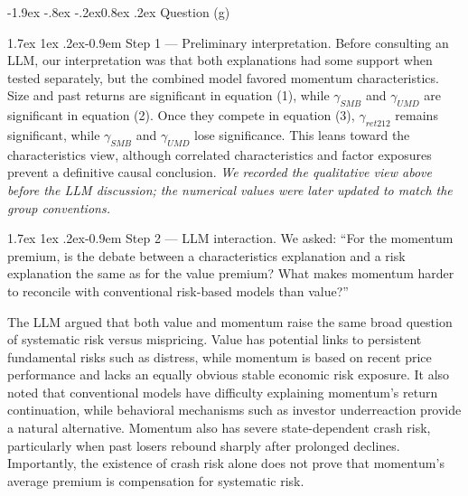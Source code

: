 \documentclass[11pt]{article}
\makeatletter
\renewcommand\subsubsection{\@startsection{subsubsection}{3}{0pt}%
  {-1.9ex \@plus -.8ex \@minus -.2ex}{0.8ex \@plus .2ex}%
  {\normalfont\bfseries\itshape\normalsize\color{psink}}}
\renewcommand\paragraph{\@startsection{paragraph}{4}{0pt}%
  {1.7ex \@plus 1ex \@minus .2ex}{-0.9em}%
  {\normalfont\bfseries\normalsize\color{psink}}}
\makeatother
\begin{document}
\subsubsection{Question (g)}

\paragraph{Step 1 --- Preliminary interpretation.} Before consulting an LLM, our
interpretation was that both explanations had some support when tested separately, but
the combined model favored momentum characteristics. Size and past returns are
significant in equation (1), while $\gamma_{SMB}$ and $\gamma_{UMD}$ are significant in
equation (2). Once they compete in equation (3), $\gamma_{ret212}$ remains significant,
while $\gamma_{SMB}$ and $\gamma_{UMD}$ lose significance. This leans toward the
characteristics view, although correlated characteristics and factor exposures prevent a
definitive causal conclusion. \emph{We recorded the qualitative view above before the LLM
discussion; the numerical values were later updated to match the group conventions.}

\paragraph{Step 2 --- LLM interaction.} We asked: ``For the momentum premium, is the
debate between a characteristics explanation and a risk explanation the same as for the
value premium? What makes momentum harder to reconcile with conventional risk-based
models than value?''

The LLM argued that both value and momentum raise the same broad question of systematic
risk versus mispricing. Value has potential links to persistent fundamental risks such as
distress, while momentum is based on recent price performance and lacks an equally
obvious stable economic risk exposure. It also noted that conventional models have
difficulty explaining momentum's return continuation, while behavioral mechanisms such as
investor underreaction provide a natural alternative. Momentum also has severe
state-dependent crash risk, particularly when past losers rebound sharply after prolonged
declines. Importantly, the existence of crash risk alone does not prove that momentum's
average premium is compensation for systematic risk.
\end{document}
